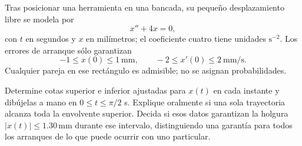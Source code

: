Tras posicionar una herramienta en una bancada, su pequeño desplazamiento libre se modela por
\[
x''+4x=0,
\]
con \(t\) en segundos y \(x\) en milímetros; el coeficiente cuatro tiene unidades \(\mathrm{s}^{-2}\). Los errores de arranque sólo garantizan
\[
-1\le x(0)\le1\ \mathrm{mm},\qquad
-2\le x'(0)\le2\ \mathrm{mm/s}.
\]
Cualquier pareja en ese rectángulo es admisible; no se asignan probabilidades.

Determine cotas superior e inferior ajustadas para \(x(t)\) en cada instante y dibújelas a mano en \(0\le t\le\pi/2\) s. Explique oralmente si una sola trayectoria alcanza toda la envolvente superior. Decida si esos datos garantizan la holgura \(|x(t)|\le1.30\,\mathrm{mm}\) durante ese intervalo, distinguiendo una garantía para todos los arranques de lo que puede ocurrir con uno particular.

